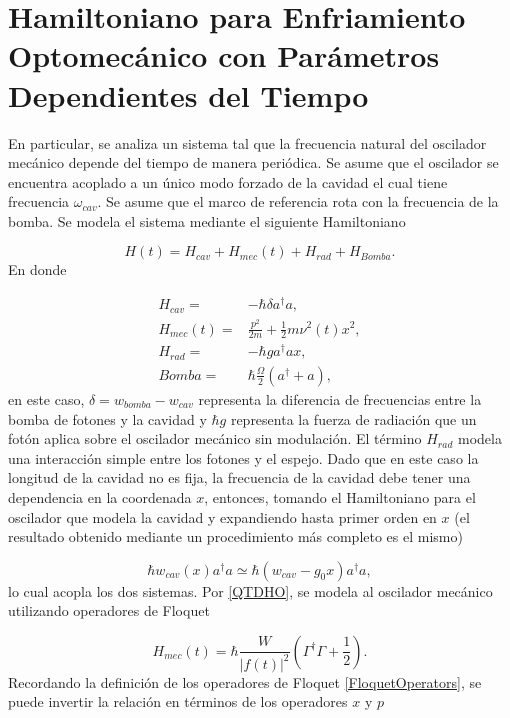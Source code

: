 \documentclass[10pt,a4paper]{report}
\begin{document}
\section{Hamiltoniano para Enfriamiento Optomecánico con Parámetros Dependientes del Tiempo}

En particular, se analiza un sistema tal que la frecuencia natural del oscilador mecánico depende del tiempo de manera periódica. Se asume que el oscilador se encuentra acoplado a un único modo forzado de la cavidad el cual tiene frecuencia $\omega_{cav}$. Se asume que el marco de referencia rota con la frecuencia de la bomba. Se modela el sistema mediante el siguiente Hamiltoniano\cite{BarberisLC}

\begin{equation}
H(t) = H_{cav} + H_{mec}(t) + H_{rad} + H_{Bomba}.
\end{equation} En donde

\begin{align}
H_{cav} =& -\hbar \delta a^\dagger a,\\
H_{mec}(t) =& \frac{p^2}{2m} + \frac{1}{2}m \nu^2 (t) x^2,\\
H_{rad} =& -\hbar g a^\dagger a x,\\
Bomba =& \hbar\frac{\Omega}{2}(a^\dagger + a),
\end{align} en este caso, $\delta = w_{bomba} - w_{cav}$ representa la diferencia de frecuencias entre la bomba de fotones y la cavidad y $\hbar g$ representa la fuerza de radiación que un fotón aplica sobre el oscilador mecánico sin modulación. El término $H_{rad}$ modela una interacción simple entre los fotones y el espejo. Dado que en este caso la longitud de la cavidad no es fija, la frecuencia de la cavidad debe tener una dependencia en la coordenada $x$, entonces, tomando el Hamiltoniano para el oscilador que modela la cavidad y expandiendo hasta primer orden en $x$ (el resultado obtenido mediante un procedimiento más completo es el mismo)\cite{KippenberCO} 

\begin{equation}
\hbar w_{cav}(x) a^\dagger a \simeq \hbar(w_{cav}-g_0x)a^\dagger a,
\end{equation}lo cual acopla los dos sistemas. Por \eqref{QTDHO}, se modela al oscilador mecánico utilizando operadores de Floquet

\begin{equation}
H_{mec}(t) = \hbar\frac{W}{|f(t)|^2}(\Gamma^\dagger \Gamma + \frac{1}{2}).
\end{equation} Recordando la definición de los operadores de Floquet \eqref{FloquetOperators}, se puede invertir la relación en términos de los operadores $x$ y $p$
\end{document}
